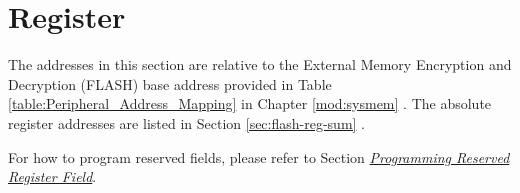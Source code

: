 \documentclass[main\_\_EN.tex]{subfiles}
\begin{document}
\section{Register}

The addresses in this section are relative to the External Memory Encryption and Decryption (FLASH) base address provided in Table \ref{table:Peripheral_Address_Mapping} in Chapter \ref{mod:sysmem} \textit{}. The absolute register addresses are listed in Section \ref{sec:flash-reg-sum} \textit{}. 

For how to program reserved fields, please refer to Section \hyperref[programming-reserved-field]{\textit{Programming Reserved Register Field}}.


\end{document}
